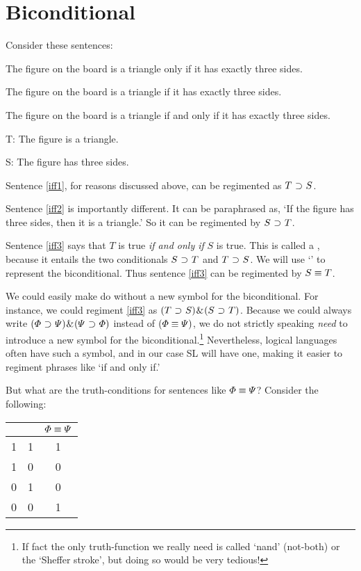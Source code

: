 \section{Biconditional}
Consider these sentences:
\begin{earg}
\item[\ex{iff1}] The figure on the board is a triangle only if it has exactly three sides.
\item[\ex{iff2}] The figure on the board is a triangle if it has exactly three sides.
\item[\ex{iff3}] The figure on the board is a triangle if and only if it has exactly three sides.
\end{earg}

\begin{ekey}
\item[T:] The figure is a triangle.
\item[S:] The figure has three sides.
\end{ekey}

Sentence \ref{iff1}, for reasons discussed above, can be regimented as $T\mkern1mu\supset\mkern1mu S$.

Sentence \ref{iff2} is importantly different.
It can be paraphrased as, `If the figure has three sides, then it is a triangle.'
So it can be regimented by $S\mkern1mu\supset\mkern1mu T$.

Sentence \ref{iff3} says that $T$ is true \emph{if and only if} $S$ is true.
This is called a , because it entails the two conditionals $S\mkern1mu\supset\mkern1mu T$ and $T \mkern1mu\supset\mkern1mu S$. We will use `\eiff' to represent the biconditional.
Thus sentence \ref{iff3} can be regimented by $S \equiv T$.

We could easily make do without a new symbol for the biconditional.
For instance, we could regiment \ref{iff3} as $(T \mkern1mu\supset\mkern1mu S)\mkern1mu\&\mkern1mu(S\mkern1mu\supset\mkern1mu T)$.
Because we could always write $(\varPhi{}\mkern1mu\supset\mkern1mu\varPsi{})\mkern1mu\&\mkern1mu(\varPsi{}\mkern1mu\supset\mkern1mu\varPhi{})$ instead of $(\varPhi{}\equiv\varPsi{})$, we do not strictly speaking \emph{need} to introduce a new symbol for the biconditional.\footnote{If fact the only truth-function we really need is called `nand' (not-both) or the `Sheffer stroke', but doing so would be very tedious!} 
Nevertheless, logical languages often have such a symbol, and in our case SL will have one, making it easier to regiment phrases like `if and only if.'

But what are the truth-conditions for sentences like $\varPhi\equiv\varPsi$? 
Consider the following:

\begin{center}
\begin{tabular}{c|c|c}
\metaA{} & \metaB{} & $\varPhi{}\equiv\varPsi{}$\\
\hline
1 & 1 & 1\\
1 & 0 & 0\\
0 & 1 & 0\\
0 & 0 & 1
\end{tabular}
\end{center}

